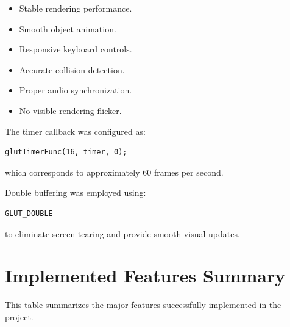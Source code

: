 \documentclass[12pt,a4paper]{report}
\begin{document}
\begin{itemize}
\item Stable rendering performance.
\item Smooth object animation.
\item Responsive keyboard controls.
\item Accurate collision detection.
\item Proper audio synchronization.
\item No visible rendering flicker.
\end{itemize}

The timer callback was configured as:

\begin{verbatim}
glutTimerFunc(16, timer, 0);
\end{verbatim}

which corresponds to approximately 60 frames per second.

Double buffering was employed using:

\begin{verbatim}
GLUT_DOUBLE
\end{verbatim}

to eliminate screen tearing and provide smooth visual updates.

\section{Implemented Features Summary}

This table summarizes the major features successfully implemented in the project.
\end{document}
